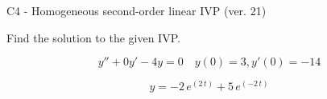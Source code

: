 \begin{exercise}
  \begin{exerciseTitle}C4 - Homogeneous second-order linear IVP (ver. 21)\end{exerciseTitle}
  \begin{exerciseStatement}
    
Find the solution to the given IVP.

    
\[y''+0y'-4y = 0 \hspace{1em} y(0) = 3 , y'(0) = -14\]

  \end{exerciseStatement}
  \begin{exerciseAnswer}
    
\[y= -2 \, e^{\left(2 \, t\right)} + 5 \, e^{\left(-2 \, t\right)}\]

  \end{exerciseAnswer}
\end{exercise}